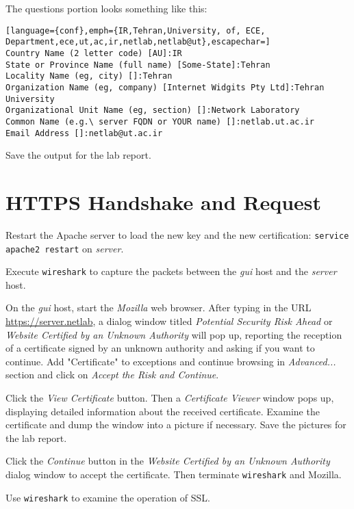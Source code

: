 \documentclass{../UTNetLab}
\begin{document}
    The questions portion looks something like this:
    {\small
    \begin{lstlisting}[language={conf},emph={IR,Tehran,University, of, ECE, Department,ece,ut,ac,ir,netlab,netlab@ut},escapechar=]
Country Name (2 letter code) [AU]:IR 
State or Province Name (full name) [Some-State]:Tehran 
Locality Name (eg, city) []:Tehran 
Organization Name (eg, company) [Internet Widgits Pty Ltd]:Tehran University 
Organizational Unit Name (eg, section) []:Network Laboratory 
Common Name (e.g.\ server FQDN or YOUR name) []:netlab.ut.ac.ir
Email Address []:netlab@ut.ac.ir
    \end{lstlisting}}

    Save the output for the lab report.

\section{HTTPS Handshake and Request}
    Restart the Apache server to load the new key and the new certification: \lstinline{service apache2 restart} on \textit{server}.

    Execute \lstinline{wireshark} to capture the packets between the \textit{gui} host and the \textit{server} host.

    On the \textit{gui} host, start the \textit{Mozilla} web browser.
    After typing in the URL \url{https://server.netlab}, a dialog window titled \textit{Potential Security Risk Ahead} or \textit{Website Certified by an Unknown Authority} will pop up, reporting the reception of a certificate signed by an unknown authority and asking if you want to continue.
    Add "Certificate" to exceptions and continue browsing in \textit{Advanced...} section and click on \textit{Accept the Risk and Continue}.

    Click the \textit{View Certificate} button.
    Then a \textit{Certificate Viewer} window pops up, displaying detailed information about the received certificate.
    Examine the certificate and dump the window into a picture if necessary.
    Save the pictures for the lab report.

    Click the \textit{Continue} button in the \textit{Website Certified by an Unknown Authority} dialog window to accept the certificate.
    Then terminate \lstinline{wireshark} and Mozilla.

    Use \lstinline{wireshark} to examine the operation of SSL.
\end{document}
